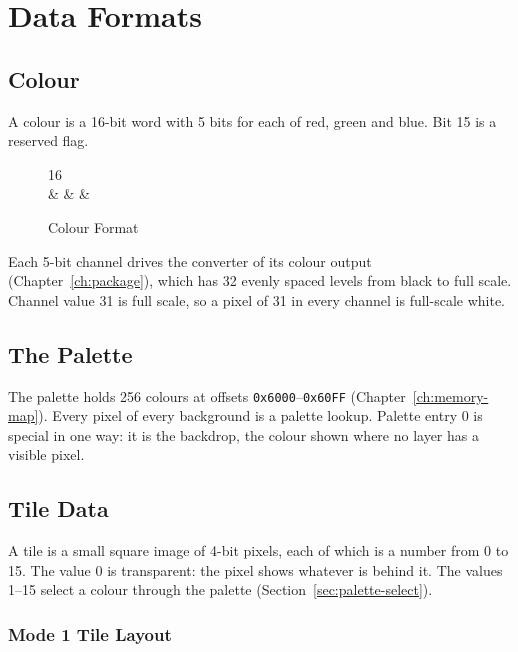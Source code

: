 \chapter{Data Formats}
\label{ch:data-formats}

\section{Colour}
\label{sec:colour}

A colour is a 16-bit word with 5 bits for each of red, green and blue. Bit 15 is a reserved flag.

\begin{figure}[H]
	\centering
	\begin{bytefield}[bitwidth=1.5em]{16}
		 \\
		 &
		 &
		 &
	\end{bytefield}
	\caption{Colour Format}
	\label{fig:colour}
\end{figure}

Each 5-bit channel drives the converter of its colour output (Chapter~\ref{ch:package}), which has 32 evenly spaced
levels from black to full scale. Channel value 31 is full scale, so a pixel of 31 in every channel is full-scale white.

\section{The Palette}
\label{sec:palette}

The palette holds 256 colours at offsets \texttt{0x6000}--\texttt{0x60FF} (Chapter~\ref{ch:memory-map}). Every pixel of
every background is a palette lookup. Palette entry 0 is special in one way: it is the backdrop, the colour shown where
no layer has a visible pixel.

\section{Tile Data}
\label{sec:tile-data}

A tile is a small square image of 4-bit pixels, each of which is a number from 0 to 15. The value 0 is transparent: the
pixel shows whatever is behind it. The values 1--15 select a colour through the palette
(Section~\ref{sec:palette-select}).

\subsection{Mode 1 Tile Layout}
\label{sec:m1-tile-layout}

